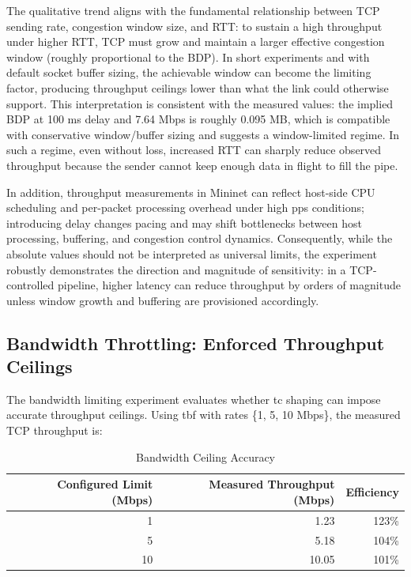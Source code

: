 \documentclass[11pt,a4paper]{article}
\begin{document}
The qualitative trend aligns with the fundamental relationship between TCP sending rate, congestion window size, and RTT: to sustain a high throughput under higher RTT, TCP must grow and maintain a larger effective congestion window (roughly proportional to the BDP). In short experiments and with default socket buffer sizing, the achievable window can become the limiting factor, producing throughput ceilings lower than what the link could otherwise support. This interpretation is consistent with the measured values: the implied BDP at 100 ms delay and 7.64 Mbps is roughly 0.095 MB, which is compatible with conservative window/buffer sizing and suggests a window-limited regime. In such a regime, even without loss, increased RTT can sharply reduce observed throughput because the sender cannot keep enough data in flight to fill the pipe.

In addition, throughput measurements in Mininet can reflect host-side CPU scheduling and per-packet processing overhead under high pps conditions; introducing delay changes pacing and may shift bottlenecks between host processing, buffering, and congestion control dynamics. Consequently, while the absolute values should not be interpreted as universal limits, the experiment robustly demonstrates the direction and magnitude of sensitivity: in a TCP-controlled pipeline, higher latency can reduce throughput by orders of magnitude unless window growth and buffering are provisioned accordingly.

\subsection{Bandwidth Throttling: Enforced Throughput Ceilings}

The bandwidth limiting experiment evaluates whether tc shaping can impose accurate throughput ceilings. Using tbf with rates \{1, 5, 10 Mbps\}, the measured TCP throughput is:

\begin{table}[H]
\centering
\caption{Bandwidth Ceiling Accuracy}
\label{tab:bandwidth}
\begin{tabular}{@{}rrr@{}}
\toprule
\textbf{Configured Limit (Mbps)} & \textbf{Measured Throughput (Mbps)} & \textbf{Efficiency} \\
\midrule
1  & 1.23  & 123\% \\
5  & 5.18  & 104\% \\
10 & 10.05 & 101\% \\
\bottomrule
\end{tabular}
\end{table}
\end{document}
